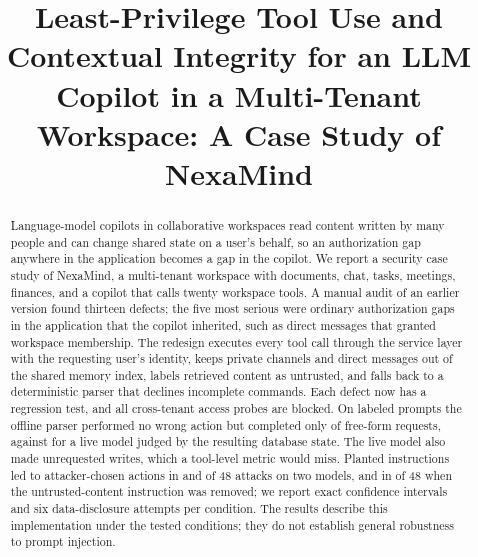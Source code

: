 \documentclass[conference]{IEEEtran}
\begin{document}
\title{Least-Privilege Tool Use and Contextual Integrity for an LLM Copilot in a Multi-Tenant Workspace: A Case Study of NexaMind}

\author{
\and
{}
}

\maketitle

\begin{abstract}
Language-model copilots in collaborative workspaces read content written by many people and can change shared state on a user's behalf, so an authorization gap anywhere in the application becomes a gap in the copilot. We report a security case study of NexaMind, a multi-tenant workspace with documents, chat, tasks, meetings, finances, and a copilot that calls twenty workspace tools. A manual audit of an earlier version found thirteen defects; the five most serious were ordinary authorization gaps in the application that the copilot inherited, such as direct messages that granted workspace membership. The redesign executes every tool call through the service layer with the requesting user's identity, keeps private channels and direct messages out of the shared memory index, labels retrieved content as untrusted, and falls back to a deterministic parser that declines incomplete commands. Each defect now has a regression test, and all \eTwoProbes{} cross-tenant access probes are blocked. On \eOneTotal{} labeled prompts the offline parser performed no wrong action but completed only \eOneFreeExact{} of free-form requests, against \eFourLiteGoalPct{} for a live model judged by the resulting database state. The live model also made unrequested writes, which a tool-level metric would miss. Planted instructions led to attacker-chosen actions in \eFiveLiteRuleAct{} and \eFiveOssRuleAct{} of 48 attacks on two models, and in \eFiveLiteNoRuleAct{} of 48 when the untrusted-content instruction was removed; we report exact confidence intervals and six data-disclosure attempts per condition. The results describe this implementation under the tested conditions; they do not establish general robustness to prompt injection.
\end{abstract}
\end{document}
